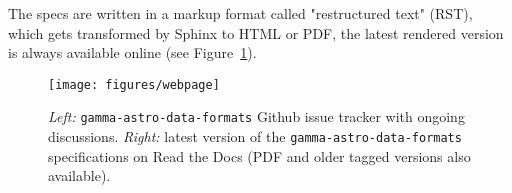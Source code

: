 The specs are written in a markup format called "restructured text" (RST),
which gets transformed by Sphinx to HTML or PDF, the latest rendered version is always available online (see Figure~\ref{fig:webpage}).

\begin{figure}[tb]
\centerline{\texttt{[image: figures/webpage]}}
\caption{
\emph{Left:} \texttt{gamma-astro-data-formats} Github issue tracker with ongoing discussions. \emph{Right:} latest version of the \texttt{gamma-astro-data-formats} specifications on Read the Docs (PDF and older tagged versions also available).
}
\label{fig:webpage}
\end{figure}
